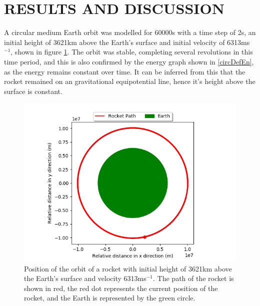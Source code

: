 \documentclass[twocolumn,prl,nobalancelastpage,aps,10pt]{revtex4-1}
\begin{document}
\section{RESULTS AND DISCUSSION}

A circular medium Earth orbit was modelled for 60000s with a time step of 2s, an initial height of 3621km above the Earth's surface and initial velocity of 6313ms$^{-1}$, shown in figure \ref{circDefFig}. The orbit was stable, completing several revolutions in this time period, and this is also confirmed by the energy graph shown in \ref{circDefEn}, as the energy remains constant over time. It can be inferred from this that the rocket remained on an gravitational equipotential line, hence it's height above the surface is constant.

\begin{figure}[ht!]
\includegraphics*[width=0.96\linewidth,clip]{circularDefault}
\caption{Position of the orbit of a rocket with initial height of 3621km above the Earth's surface and velocity 6313ms$^{-1}$. The path of the rocket is shown in red, the red dot represents the current position of the rocket, and the Earth is represented by the green circle.} \label{circDefFig}
\end{figure}
\end{document}

